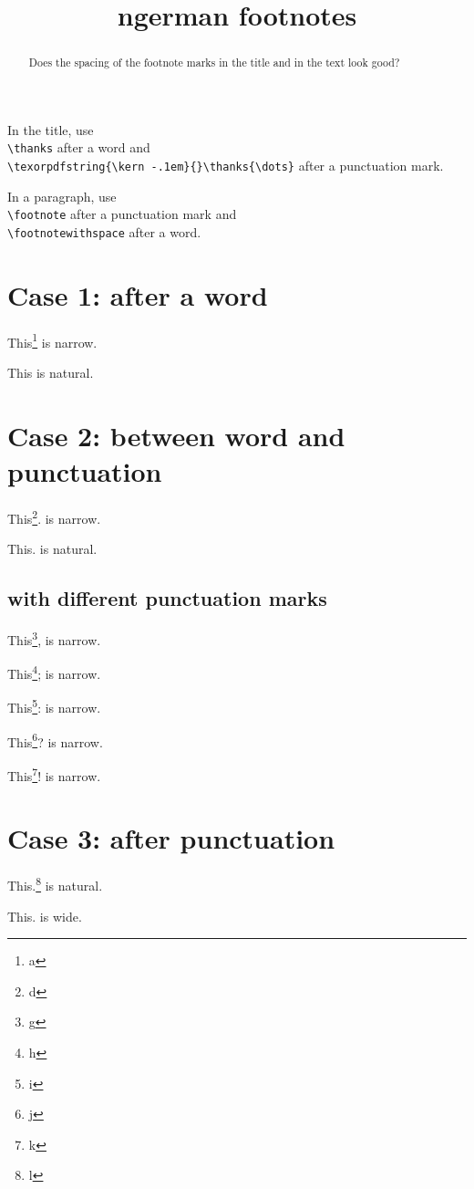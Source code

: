 \documentclass{snapshotmfo}
\author{%
natural\thanks{natural spacing} and
narrow,\texorpdfstring{\hskip -.1em}{}\thanks{narrow spacing}
spacing of footnotemarks in the title
\and Author Two}
\title{ngerman footnotes}
\begin{document}

\begin{abstract}
Does the spacing of the footnote marks in the title and in the text look good?
\end{abstract}

In the title, use\\
\verb+\thanks+ after a word and\\
\verb+\texorpdfstring{\kern -.1em}{}\thanks{\dots}+ after a punctuation mark.

In a paragraph, use\\
\verb+\footnote+ after a punctuation mark and\\
\verb+\footnotewithspace+ after a word.


\section{Case 1: after a word}

\noindent This\footnote{a} is narrow.

\noindent This is natural.


\section{Case 2: between word and punctuation}

\noindent This\footnote{d}. is narrow.

\noindent This. is natural.


\subsection{with different punctuation marks}

\noindent This\footnote{g}, is narrow.

\noindent This\footnote{h}; is narrow.

\noindent This\footnote{i}: is narrow.

\noindent This\footnote{j}? is narrow.

\noindent This\footnote{k}! is narrow.


\section{Case 3: after punctuation}

\noindent This.\footnote{l} is natural.

\noindent This. is wide.
\end{document}
